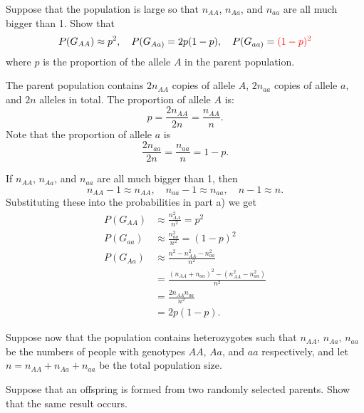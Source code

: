 \documentclass[addpoints,answers]{exam}
\begin{document}
\begin{questions}
\question
Suppose that the population is large so that $n_{AA}$, $n_{Aa}$, and $n_{aa}$ are all much bigger than 1. Show that
$$
P(G_{AA}) \approx p^2, \quad P(G_{Aa)}=2p(1-p), \quad P(G_{aa)}=\textcolor{red}{(1-p)^2}
$$
where $p$ is the proportion of the allele $A$ in the parent population.

\begin{solution}
The parent population contains $2n_{AA}$ copies of allele $A$, $2n_{aa}$ copies of allele $a$, and $2n$ alleles in total. The proportion of allele $A$ is:
$$
p=\frac{2n_{AA}}{2n}=\frac{n_{AA}}{n}.
$$
Note that the proportion of allele $a$ is
$$
\frac{2n_{aa}}{2n}=\frac{n_{aa}}{n}=1-p.
$$

If $n_{AA}$, $n_{Aa}$, and $n_{aa}$ are all much bigger than 1, then 
$$
n_{AA} - 1 \approx n_{AA}, \quad  n_{aa} - 1 \approx n_{aa}, \quad n - 1 \approx n.
$$
Substituting these into the probabilities in part a) we get
$$
\begin{aligned}
P(G_{AA})&\approx \frac{n_{AA}^2}{n^2}=p^2\\
P(G_{aa})&\approx \frac{n_{aa}^2}{n^2}=(1-p)^2\\
P(G_{Aa})&\approx \frac{n^2-n_{AA}^2-n_{aa}^2}{n^2}\\
&=\frac{(n_{AA} + n_{aa})^2 - (n_{AA}^2-n_{aa}^2)}{n^2}\\
&=\frac{2n_{AA}n_{aa}}{n^2}\\
&=2p(1-p).
\end{aligned}
$$
\end{solution}

\question
   Suppose now that the population contains heterozygotes such that $n_{AA}$, $n_{Aa}$, $n_{aa}$ be the numbers of people with genotypes $AA$, $Aa$, and $aa$ respectively, and let $n=n_{AA}+n_{Aa}+n_{aa}$ be the total population size. 
   
  \medskip
  
  Suppose that an offspring is formed from two randomly selected parents. Show that the same result occurs.
  

\end{questions}
\end{document}
